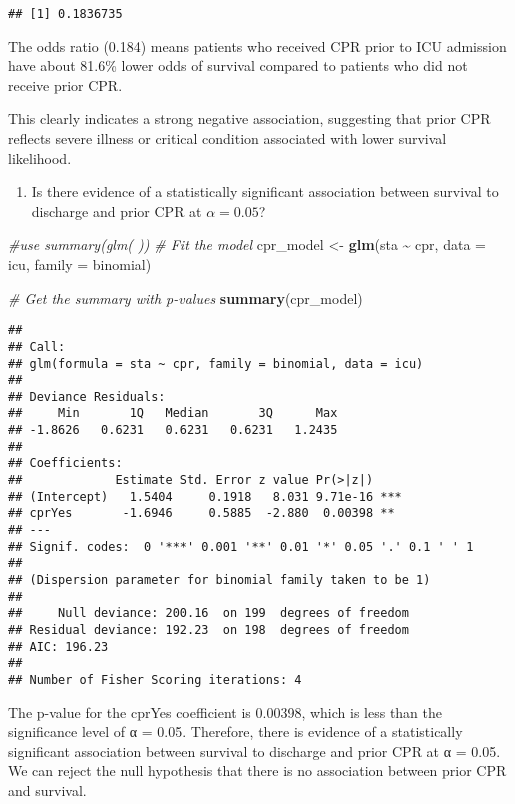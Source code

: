 \documentclass[
]{article}
\newenvironment{Shaded}{\begin{snugshade}}{\end{snugshade}}
\newcommand{\AttributeTok}[1]{\textcolor[rgb]{0.13,0.29,0.53}{#1}}
\newcommand{\CommentTok}[1]{\textcolor[rgb]{0.56,0.35,0.01}{\textit{#1}}}
\newcommand{\FunctionTok}[1]{\textcolor[rgb]{0.13,0.29,0.53}{\textbf{#1}}}
\newcommand{\NormalTok}[1]{#1}
\newcommand{\OtherTok}[1]{\textcolor[rgb]{0.56,0.35,0.01}{#1}}
\newcommand{\SpecialCharTok}[1]{\textcolor[rgb]{0.81,0.36,0.00}{\textbf{#1}}}
\providecommand{\tightlist}{%
  \setlength{\itemsep}{0pt}\setlength{\parskip}{0pt}}
\begin{document}
\begin{verbatim}
## [1] 0.1836735
\end{verbatim}

The odds ratio (0.184) means patients who received CPR prior to ICU
admission have about 81.6\% lower odds of survival compared to patients
who did not receive prior CPR.

This clearly indicates a strong negative association, suggesting that
prior CPR reflects severe illness or critical condition associated with
lower survival likelihood.

\begin{enumerate}
\def\labelenumi{\alph{enumi})}
\setcounter{enumi}{4}
\tightlist
\item
  Is there evidence of a statistically significant association between
  survival to discharge and prior CPR at \(\alpha = 0.05\)?
\end{enumerate}

\begin{Shaded}
\begin{Highlighting}[]
\CommentTok{\#use summary(glm( ))}
\CommentTok{\# Fit the model}
\NormalTok{cpr\_model }\OtherTok{\textless{}{-}} \FunctionTok{glm}\NormalTok{(sta }\SpecialCharTok{\textasciitilde{}}\NormalTok{ cpr, }\AttributeTok{data =}\NormalTok{ icu, }\AttributeTok{family =}\NormalTok{ binomial)}

\CommentTok{\# Get the summary with p{-}values}
\FunctionTok{summary}\NormalTok{(cpr\_model)}
\end{Highlighting}
\end{Shaded}

\begin{verbatim}
## 
## Call:
## glm(formula = sta ~ cpr, family = binomial, data = icu)
## 
## Deviance Residuals: 
##     Min       1Q   Median       3Q      Max  
## -1.8626   0.6231   0.6231   0.6231   1.2435  
## 
## Coefficients:
##             Estimate Std. Error z value Pr(>|z|)    
## (Intercept)   1.5404     0.1918   8.031 9.71e-16 ***
## cprYes       -1.6946     0.5885  -2.880  0.00398 ** 
## ---
## Signif. codes:  0 '***' 0.001 '**' 0.01 '*' 0.05 '.' 0.1 ' ' 1
## 
## (Dispersion parameter for binomial family taken to be 1)
## 
##     Null deviance: 200.16  on 199  degrees of freedom
## Residual deviance: 192.23  on 198  degrees of freedom
## AIC: 196.23
## 
## Number of Fisher Scoring iterations: 4
\end{verbatim}

The p-value for the cprYes coefficient is 0.00398, which is less than
the significance level of α = 0.05. Therefore, there is evidence of a
statistically significant association between survival to discharge and
prior CPR at α = 0.05. We can reject the null hypothesis that there is
no association between prior CPR and survival.
\end{document}
